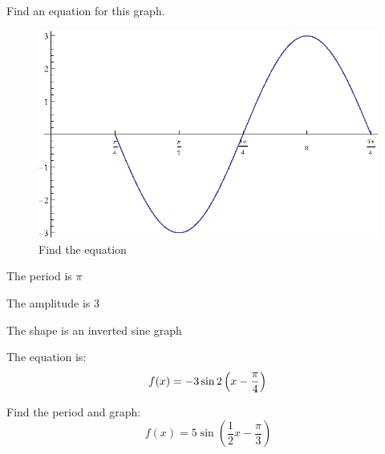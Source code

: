 \documentclass[fleqn,addpoints]{exam}
\begin{document}
\begin{questions}

    \pagebreak

    \question[10]
      Find an equation for this graph.
      
      \begin{figure}[H]
        \centering
        \includegraphics[scale=0.7]{find_equation.eps}
        \caption{Find the equation}
      \end{figure}

      \begin{solution}
        \begin{itemize*}
          \item The period is $\pi$
          \item The amplitude is 3
          \item The shape is an inverted sine graph
        \end{itemize*}

        The equation is:
        \[
          f(x) = - 3 \sin 2 \left( x - \frac{\pi}{4} \right) \\
        \]

      \end{solution}

    \question[10]
      Find the period and graph:
      \[
        f(x) = 5 \sin \left( \frac{1}{2} x - \frac{\pi}{3} \right)
      \]


\end{questions}
\end{document}
